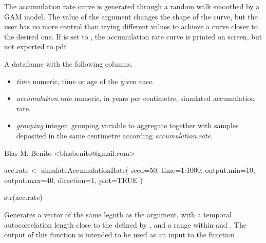 \documentclass[letterpaper]{book}
\begin{document}
%
\begin{Details}\relax
The accumulation rate curve is generated through a random walk smoothed by a GAM model. The value of the  argument changes the shape of the curve, but the user has no more control than trying different values to achieve a curve closer to the desired one. If  is set to , the accumulation rate curve is printed on screen, but not exported to pdf.
\end{Details}
%
\begin{Value}
A dataframe with the following columns.
\begin{itemize}

\item \emph{time} numeric, time or age of the given case.
\item \emph{accumulation.rate} numeric, in years per centimetre, simulated accumulation rate.
\item \emph{grouping} integer, grouping variable to aggregate together with  samples deposited in the same centimetre according \emph{accumulation.rate}.

\end{itemize}

\end{Value}
%
\begin{Author}\relax
Blas M. Benito  <blasbenito@gmail.com>
\end{Author}
%
\begin{SeeAlso}\relax
{}
\end{SeeAlso}
%
\begin{Examples}
\begin{ExampleCode}

acc.rate <- simulateAccumulationRate(
 seed=50,
 time=1:1000,
 output.min=10,
 output.max=40,
 direction=1,
 plot=TRUE
 )

str(acc.rate)

\end{ExampleCode}
\end{Examples}
%
\begin{Description}\relax
Generates a vector of the same legnth as the  argument, with a temporal autocorrelation length close to the defined by , and a range within  and . The output of this function is intended to be used as an input to the function .
\end{Description}
\end{document}
